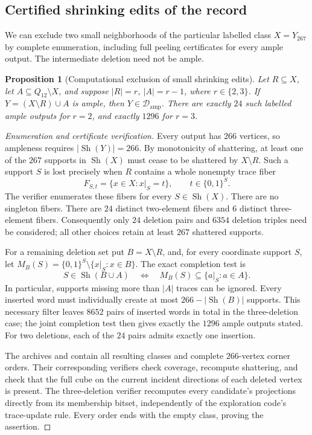 \documentclass[11pt]{article}
\numberwithin{equation}{section}
\newtheorem{proposition}[theorem]{Proposition}
\theoremstyle{definition}
\theoremstyle{remark}
\newcommand{\Damp}{\mathcal D_{\mathrm{amp}}}
\newcommand{\Sh}{\operatorname{Sh}}
\begin{document}
\subsection{Certified shrinking edits of the record}
\label{sec:record-shrinking-edits}

We can exclude two small neighborhoods of the particular labelled class
\(X=Y_{267}\) by complete enumeration, including full peeling certificates
for every ample output.  The intermediate deletion need not be ample.

\begin{proposition}[Computational exclusion of small shrinking edits]
\label{prop:record-small-shrinking-edits}
Let \(R\subseteq X\), let \(A\subseteq Q_{12}\setminus X\), and suppose
\(|R|=r\), \(|A|=r-1\), where \(r\in\{2,3\}\).
If \(Y=(X\setminus R)\cup A\) is ample, then \(Y\in\Damp\).
There are exactly \(24\) such labelled ample outputs for \(r=2\), and
exactly \(1296\) for \(r=3\).
\end{proposition}

\begin{proof}[Enumeration and certificate verification]
Every output has \(266\) vertices, so ampleness requires
\(|\Sh(Y)|=266\).  By monotonicity of shattering, at least one of the
\(267\) supports in \(\Sh(X)\) must cease to be shattered by
\(X\setminus R\).  Such a support \(S\) is lost precisely when \(R\)
contains a whole nonempty trace fiber
\[
 F_{S,t}=\{x\in X:x|_S=t\},\qquad t\in\{0,1\}^S.
\]
The verifier enumerates these fibers for every \(S\in\Sh(X)\).
There are no singleton fibers.  There are \(24\) distinct two-element
fibers and \(6\) distinct three-element fibers.  Consequently only
\(24\) deletion pairs and \(6354\) deletion triples need be considered;
all other choices retain at least \(267\) shattered supports.

For a remaining deletion set put \(B=X\setminus R\), and, for every
coordinate support \(S\), let
\(M_B(S)=\{0,1\}^S\setminus\{x|_S:x\in B\}\).
The exact completion test is
\[
 S\in\Sh(B\cup A)
 \quad\Longleftrightarrow\quad
 M_B(S)\subseteq\{a|_S:a\in A\}.
\]
In particular, supports missing more than \(|A|\) traces can be ignored.
Every inserted word must individually create at most
\(266-|\Sh(B)|\) supports.  This necessary filter leaves \(8652\)
pairs of inserted words in total in the three-deletion case; the joint
completion test then gives exactly the \(1296\) ample outputs stated.
For two deletions, each of the \(24\) pairs admits exactly one insertion.

The archives  and
 contain all resulting classes and
complete \(266\)-vertex corner orders.  Their corresponding
 verifiers check coverage, recompute
shattering, and check that the full cube on the current incident
directions of each deleted vertex is present.  The three-deletion verifier
recomputes every candidate's projections directly from its membership
bitset, independently of the exploration code's trace-update rule.
Every order ends with the empty class, proving the assertion.
\end{proof}
\end{document}
